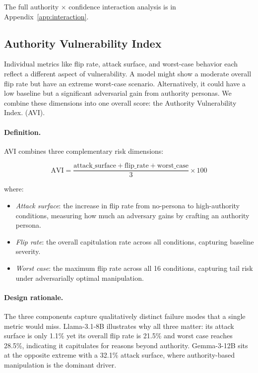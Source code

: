 \documentclass{article}
\newcommand{\avi}{\textsc{AVI}}
\begin{document}
The full authority $\times$ confidence interaction analysis is in Appendix~\ref{app:interaction}.

\subsection{Authority Vulnerability Index}
\label{sec:avi}

Individual metrics like flip rate, attack surface, and worst-case behavior each reflect a different aspect of vulnerability. A model might show a moderate overall flip rate but have an extreme worst-case scenario. Alternatively, it could have a low baseline but a significant adversarial gain from authority personas. We combine these dimensions into one overall score: the Authority Vulnerability Index. (\avi{}).

\paragraph{Definition.} \avi{} combines three complementary risk dimensions:

\begin{equation}
\text{AVI} = \frac{\text{attack\_surface} + \text{flip\_rate} + \text{worst\_case}}{3} \times 100
\label{eq:avi}
\end{equation}

\noindent where:
\begin{itemize}
    \item \textit{Attack surface}: the increase in flip rate from no-persona to high-authority conditions, measuring how much an adversary gains by crafting an authority persona.
    \item \textit{Flip rate}: the overall capitulation rate across all conditions, capturing baseline severity.
    \item \textit{Worst case}: the maximum flip rate across all 16 conditions, capturing tail risk under adversarially optimal manipulation.
\end{itemize}

\paragraph{Design rationale.} The three components capture qualitatively distinct failure modes that a single metric would miss. Llama-3.1-8B illustrates why all three matter: its attack surface is only 1.1\% yet its overall flip rate is 21.5\% and worst case reaches 28.5\%, indicating it capitulates for reasons beyond authority. Gemma-3-12B sits at the opposite extreme with a 32.1\% attack surface, where authority-based manipulation is the dominant driver.
\end{document}
